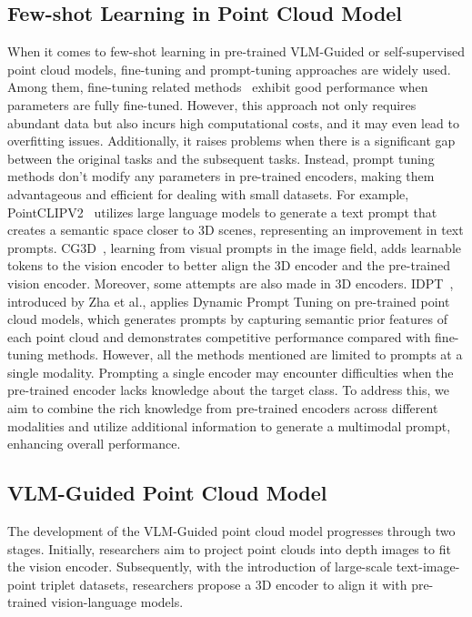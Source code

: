 \documentclass{ecai}
\begin{document}
\subsection{Few-shot Learning in Point Cloud Model}
When it comes to few-shot learning in pre-trained VLM-Guided or self-supervised point cloud models, fine-tuning and prompt-tuning approaches are widely used. Among them, fine-tuning related methods~\cite{liu2023regress, wang2021unsupervised,yu2022point} exhibit good performance when parameters are fully fine-tuned. However, this approach not only requires abundant data but also incurs high computational costs, and it may even lead to overfitting issues. Additionally, it raises problems when there is a significant gap between the original tasks and the subsequent tasks. Instead, prompt tuning methods don't modify any parameters in pre-trained encoders, making them advantageous and efficient for dealing with small datasets. For example, PointCLIPV2~\cite{zhu2023pointclip} utilizes large language models to generate a text prompt that creates a semantic space closer to 3D scenes, representing an improvement in text prompts. CG3D~\cite{hegde2023clip}, learning from visual prompts in the image field, adds learnable tokens to the vision encoder to better align the 3D encoder and the pre-trained vision encoder. Moreover, some attempts are also made in 3D encoders. IDPT~\cite{zha2023instance}, introduced by Zha et al., applies Dynamic Prompt Tuning on pre-trained point cloud models, which generates prompts by capturing semantic prior features of each point cloud and demonstrates competitive performance compared with fine-tuning methods. However, all the methods mentioned are limited to prompts at a single modality. Prompting a single encoder may encounter difficulties when the pre-trained encoder lacks knowledge about the target class. To address this, we aim to combine the rich knowledge from pre-trained encoders across different modalities and utilize additional information to generate a multimodal prompt, enhancing overall performance.

\subsection{VLM-Guided Point Cloud Model}
The development of the VLM-Guided point cloud model progresses through two stages. Initially, researchers aim to project point clouds into depth images to fit the vision encoder. Subsequently, with the introduction of large-scale text-image-point triplet datasets, researchers propose a 3D encoder to align it with pre-trained vision-language models. 
\end{document}

